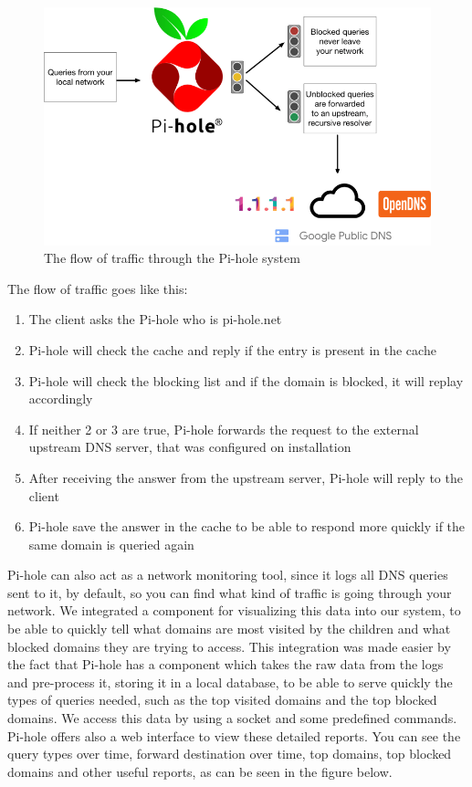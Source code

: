 \begin{figure}[th]
\centering
\includegraphics[width=1\textwidth]{Figures/pihole-dns}
\decoRule
\caption{The flow of traffic through the Pi-hole system}
\label{fig:pihole-dns}
\end{figure}

The flow of traffic goes like this:
\begin{enumerate}
\item The client asks the Pi-hole who is pi-hole.net
\item Pi-hole will check the cache and reply if the entry is present in the cache
\item Pi-hole will check the blocking list and if the domain is blocked, it will replay accordingly
\item If neither 2 or 3 are true, Pi-hole forwards the request to the external upstream DNS server, that was configured on installation
\item After receiving the answer from the upstream server, Pi-hole will reply to the client
\item Pi-hole save the answer in the cache to be able to respond more quickly if the same domain is queried again
\end{enumerate}

Pi-hole can also act as a network monitoring tool, since it logs all DNS queries sent to it, by default, so you can find what kind of traffic is going through your network. We integrated a component for visualizing this data into our system, to be able to quickly tell what domains are most visited by the children and what blocked domains they are trying to access. This integration was made easier by the fact that Pi-hole has a component which takes the raw data from the logs and pre-process it, storing it in a local database, to be able to serve quickly the types of queries needed, such as the top visited domains and the top blocked domains. We access this data by using a socket and some predefined commands. Pi-hole offers also a web interface to view these detailed reports. You can see the query types over time, forward destination over time, top domains, top blocked domains and other useful reports, as can be seen in the figure below.

